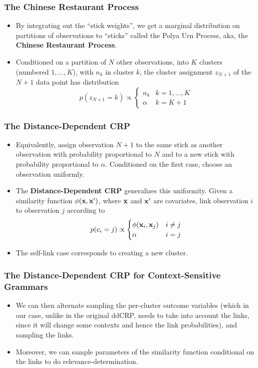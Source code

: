 \documentclass[11pt, serif, mathserif, table,trans]{beamer}
\begin{document}
\begin{frame}
  \frametitle{The Chinese Restaurant Process}
  \begin{itemize}[<+->]
  \item By integrating out the ``stick weights'', we get a marginal
    distribution on partitions of observations to ``sticks'' called
    the Polya Urn Process, aka, the {\bf Chinese Restaurant Process}.
  \item Conditioned on a partition of $N$ other observations, into $K$
    clusters (numbered $1, \dots, K$), with $n_k$ in cluster $k$, 
    the cluster assignment $z_{N+1}$ of the
    $N+1$ data point has distribution
    \begin{equation}
      \label{eq:30}
      p(z_{N+1} = k) \propto
      \begin{cases}
        n_k & k = 1, \dots, K \\
        \alpha & k = K+1
      \end{cases}
    \end{equation}
  \end{itemize}
\end{frame}

\begin{frame}
  \frametitle{The Distance-Dependent CRP}
  \begin{itemize}[<+->]
  \item Equivalently, assign observation $N+1$ to the same stick as
    another observation with probability proportional to $N$ and to a
    new stick with probability proportional to $\alpha$.  Conditioned
    on the first case, choose an observation uniformly.
  \item The {\bf Distance-Dependent CRP} generalizes this uniformity.
    Given a similarity function $\phi(\mathbf{x}, \mathbf{x}')$, where $\mathbf{x}$ and
    $\mathbf{x}'$ are covariates, link observation $i$ to
    observation $j$ according to
    \begin{equation}
      \label{eq:31}
      p(c_i = j) \propto
      \begin{cases}
        \phi(\mathbf{x}_i,\mathbf{x}_j) & i \neq j \\
        \alpha & i = j
      \end{cases}
    \end{equation}
  \item The self-link case corresponds to creating a new cluster.
  \end{itemize}
\end{frame}

\begin{frame}
  \frametitle{The Distance-Dependent CRP for Context-Sensitive Grammars}
  \begin{itemize}[<+->]
  \item We can then alternate sampling the per-cluster outcome
    variables (which in our case, unlike in the original ddCRP, needs
    to take into account the links, since it will change some
    contexts and hence the link probabilities), 
    and sampling the links.
  \item Moreover, we can sample parameters of the similarity function
    conditional on the links to do relevance-determination.
  \end{itemize}
\end{frame}
\end{document}
